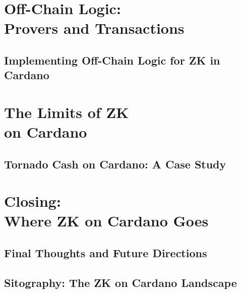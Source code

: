 \part{Off-Chain Logic:\\Provers and Transactions}
\newpage
\chapter{Implementing Off-Chain Logic for ZK in Cardano} \label{ch:offchain}


\part{The Limits of ZK\\on Cardano}
\newpage
\chapter{Tornado Cash on Cardano: A Case Study} \label{ch:tornado}


\part{Closing:\\Where ZK on Cardano Goes}
\newpage
\chapter{Final Thoughts and Future Directions} \label{ch:future}


\newpage
\chapter{Sitography: The ZK on Cardano Landscape} \label{ch:sitography}



